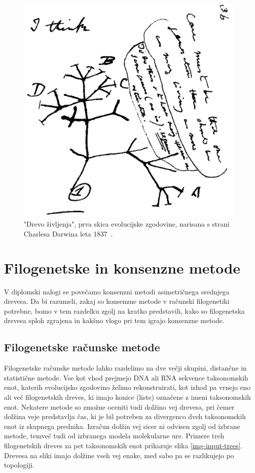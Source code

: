 \documentclass[a4paper, 12pt]{book}
\begin{document}
\begin{figure}
	\begin{center}
		\includegraphics[scale=0.5]{gfx/darwin_tree.jpg}
	\end{center}
	\caption{"Drevo življenja", prva skica evolucijske zgodovine, narisana s strani Charlesa Darwina leta 1837~\cite{cd}.}
	\label{img-darwin-tree}
\end{figure}


\chapter{Filogenetske in konsenzne metode}

V diplomski nalogi se povečamo konsenzni metodi asimetričnega srednjega drevesa. Da bi razumeli, zakaj so konsenzne metode v računski filogenetiki potrebne, bomo v tem razdelku zgolj na kratko predstavili, kako so filogenetska drevesa sploh zgrajena in kakšno vlogo pri tem igrajo konsenzne metode. 

\section{Filogenetske računske metode}

Filogenetske računske metode lahko razdelimo na dve večji skupini, distančne in statistične metode. Vse kot vhod prejmejo DNA ali RNA sekvence taksonomskih enot, katerih evolucijsko zgodovino želimo rekonstruirati, kot izhod pa vrnejo eno ali več filogenetskih dreves, ki imajo konice (liste) označene z imeni taksonomskih enot. Nekatere metode so zmožne oceniti tudi dolžino vej drevesa, pri čemer dolžina veje predstavlja čas, ki je bil potreben za divergenco dveh taksonomskih enot iz skupnega prednika. Izračun dolžin vej sicer ni odvisen zgolj od izbrane metode, temveč tudi od izbranega modela molekularne ure. Primere treh filogenetskih dreves za pet taksonomskih enot prikazuje slika \ref{img-input-trees}. Drevesa na sliki imajo dolžine vseh vej enake, med sabo pa se razlikujejo po topologiji.
\end{document}

